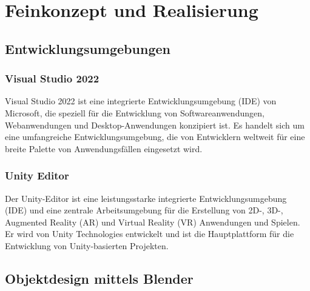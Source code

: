 \usepackage{graphicx}\chapter{Feinkonzept und Realisierung}

\section{Entwicklungsumgebungen}
\subsection{Visual Studio 2022}
Visual Studio 2022 ist eine integrierte Entwicklungsumgebung (IDE) von Microsoft, die speziell für die Entwicklung von
Softwareanwendungen, Webanwendungen und Desktop-Anwendungen konzipiert ist. Es handelt sich um eine umfangreiche
Entwicklungsumgebung, die von Entwicklern weltweit für eine breite Palette von Anwendungsfällen eingesetzt wird.

\subsection{Unity Editor}
Der Unity-Editor ist eine leistungsstarke integrierte Entwicklungsumgebung (IDE) und eine zentrale Arbeitsumgebung
für die Erstellung von 2D-, 3D-, Augmented Reality (AR) und Virtual Reality (VR) Anwendungen und Spielen. Er wird von
Unity Technologies entwickelt und ist die Hauptplattform für die Entwicklung von Unity-basierten Projekten.

\section{Objektdesign mittels Blender}
